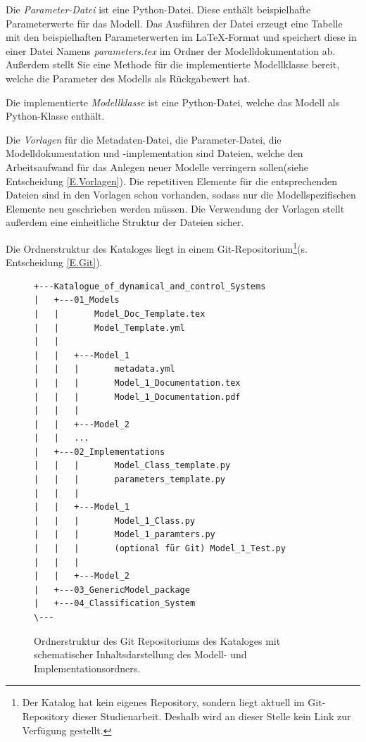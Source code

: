 Die \textit{Parameter-Datei} ist eine Python-Datei. Diese enthält beispielhafte Parameterwerte für das Modell. Das Ausführen der Datei erzeugt eine Tabelle mit den beispielhaften Parameterwerten im \LaTeX-Format und speichert diese in einer Datei Namens \textit{parameters.tex} im Ordner der Modelldokumentation ab. Außerdem stellt Sie eine Methode für die implementierte Modellklasse bereit, welche die Parameter des Modells als Rückgabewert hat.

Die implementierte \textit{Modellklasse} ist eine Python-Datei, welche das Modell als Python-Klasse enthält. 

Die \textit{Vorlagen} für die Metadaten-Datei, die Parameter-Datei, die Modelldokumentation und -implementation sind Dateien, welche den Arbeitsaufwand für das Anlegen neuer Modelle verringern sollen(siehe Entscheidung \ref{E.Vorlagen}). Die repetitiven Elemente für die entsprechenden Dateien sind in den Vorlagen schon vorhanden, sodass nur die Modellspezifischen Elemente neu geschrieben werden müssen. Die Verwendung der Vorlagen stellt außerdem eine einheitliche Struktur der Dateien sicher.

Die Ordnerstruktur des Kataloges liegt in einem Git-Repositorium\footnote{Der Katalog hat kein eigenes Repository, sondern liegt aktuell im Git-Repository dieser Studienarbeit. Deshalb wird an dieser Stelle kein Link zur Verfügung gestellt.}(s. Entscheidung \ref{E.Git}).  

\begin{figure}[H]
	\centering
	\begin{adjustbox}{padding=15pt 0pt 0pt 0pt, fbox}
		\begin{lstlisting}[basicstyle=\footnotesize, extendedchars=false]
+---Katalogue_of_dynamical_and_control_Systems
|   +---01_Models
|   |       Model_Doc_Template.tex
|   |       Model_Template.yml 
|   |
|   |   +---Model_1
|   |   |       metadata.yml
|   |   |       Model_1_Documentation.tex
|   |   |       Model_1_Documentation.pdf	
|   |   |
|   |   +---Model_2
|   |   ...
|   +---02_Implementations
|   |   |       Model_Class_template.py
|   |   |       parameters_template.py
|   |   |             
|   |   +---Model_1
|   |   |       Model_1_Class.py
|   |   |       Model_1_paramters.py
|   |   |       (optional für Git) Model_1_Test.py
|   |   |
|   |   +---Model_2
|   +---03_GenericModel_package
|   +---04_Classification_System
\---
		\end{lstlisting}
	\end{adjustbox}
	\caption[Ordnerstruktur des Kataloges]{Ordnerstruktur des Git Repositoriums des Kataloges mit schematischer Inhaltsdarstellung des Modell- und Implementationsordners.}
	\label{fig:Ordnerstruktur}
\end{figure}

